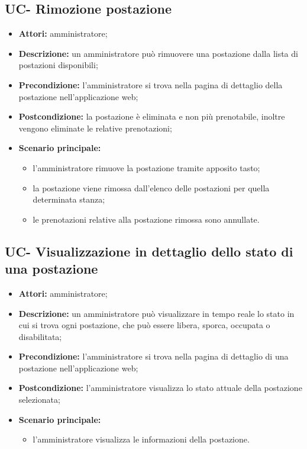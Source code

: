 \subsection{UC- Rimozione postazione}
\begin{itemize}
    \item \textbf{Attori:} amministratore;
    \item \textbf{Descrizione:} un amministratore pu\`{o} rimuovere una postazione dalla lista di postazioni disponibili;
    \item \textbf{Precondizione:} l'amministratore si trova nella pagina di dettaglio della postazione nell'applicazione web;
    \item \textbf{Postcondizione:} la postazione \`{e} eliminata e non più prenotabile, inoltre vengono eliminate le relative prenotazioni;
    \item \textbf{Scenario principale:}
    \begin{itemize}
        \item l'amministratore rimuove la postazione tramite apposito tasto;
        \item la postazione viene rimossa dall'elenco delle postazioni per quella determinata stanza;
        \item le prenotazioni relative alla postazione rimossa sono annullate.
    \end{itemize}
\end{itemize}


\subsection{UC- Visualizzazione in dettaglio dello stato di una postazione}
\begin{itemize}
    \item \textbf{Attori:} amministratore;
    \item \textbf{Descrizione:} un amministratore pu\`{o} visualizzare in tempo reale lo stato in cui si trova ogni postazione, che può essere libera, sporca, occupata o disabilitata;
    \item \textbf{Precondizione:} l'amministratore si trova nella pagina di dettaglio di una postazione nell'applicazione web;
    \item \textbf{Postcondizione:} l'amministratore visualizza lo stato attuale della postazione selezionata;
    \item \textbf{Scenario principale:}
    \begin{itemize}
        \item l'amministratore visualizza le informazioni della postazione.
    \end{itemize}
\end{itemize}

